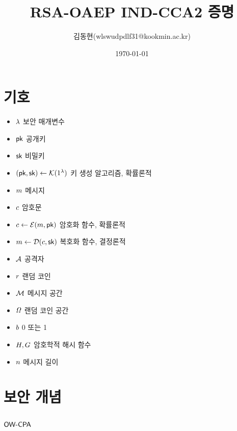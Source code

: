 \documentclass{article}
\title{RSA-OAEP IND-CCA2 증명}
\author{김동현(wlswudpdlf31@kookmin.ac.kr)}
\date{\today}
\begin{document}
\maketitle

\section{기호}

\begin{itemize}
	\item $\sp$ 보안 매개변수
	\item $\pk$ 공개키
	\item $\sk$ 비밀키
	\item $(\pk, \sk) \gets \genkey(1^{\sp})$ 키 생성 알고리즘, 확률론적
	\item $\msg$ 메시지
	\item $\ct$ 암호문
	\item $\ct \gets \enc(\msg, \pk)$ 암호화 함수, 확률론적
	\item $\msg \gets \dec(\ct, \sk)$ 복호화 함수, 결정론적
	\item $\adv$ 공격자
	\item $\coin$ 랜덤 코인
	\item $\msgspace$ 메시지 공간
	\item $\coinspace$ 랜덤 코인 공간
	\item $\bit$ 0 또는 1
	\item $\hash, \gash$ 암호학적 해시 함수
	\item $\mlen$ 메시지 길이
\end{itemize}

\newpage
\section{보안 개념}

\subsection{$\owcpa$}
\end{document}
